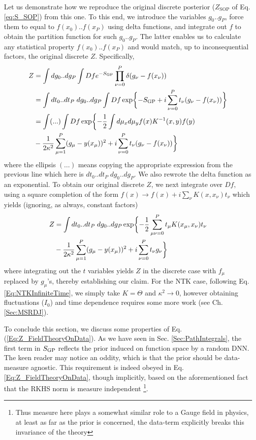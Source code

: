 Let us demonstrate how we reproduce the original discrete posterior  ($Z_{\textrm{SOP}}$ of Eq. \eqref{eq:S_SOP}) from this one. To this end, we introduce the variables $g_0..g_P$, force them to equal to $f(x_0)..f(x_P)$ using delta functions, and integrate out $f$ to obtain the partition function for such $g_0..g_P$. The latter enables us to calculate any statistical property $f(x_0)..f(x_P)$ and would match, up to inconsequential factors, the original discrete $Z$. Specifically, 
\begin{align}
Z &= \int dg_0..dg_P \int Df  e^{-S_{\text{GP}}} \prod_{\nu=0}^P \delta(g_{\nu}-f(x_{\nu})) \\ \nonumber 
&= \int dt_0..dt_P \; dg_0..dg_P \int Df \exp\biggl\{-S_{\text{GP}}+i\sum_{\nu=0}^P t_{\nu}(g_{\nu}-f(x_{\nu})) \biggl\} \\ \nonumber
&= \notag \int (...) \int Df \exp\biggl\{-\frac{1}{2} \int d\mu_x d\mu_y f(x) K^{-1}(x,y) f(y) \\&- \frac{1}{2\kappa^2}\sum_{\mu=1}^P (g_{\mu}-y(x_{\mu}))^2+i\sum_{\nu=0}^P t_{\nu}(g_{\nu}-f(x_{\nu})) \biggl\}
\end{align}
where the ellipsis $(...)$ means copying the appropriate expression from the previous line which here is $dt_0..dt_P \; dg_0..dg_P$. We also rewrote the delta function as an exponential. To obtain our original discrete $Z$, we next integrate over $Df$, using a square completion of the form $f(x) \rightarrow f(x)+i\sum_{\nu} K(x,x_{\nu})t_{\nu}$ which yields (ignoring, as always, constant factors)  
\begin{align}
\notag Z &= \int dt_0..dt_P \; dg_0..dg_P \exp\biggl\{-\frac{1}{2} \sum_{\mu \nu=0}^P t_{\mu} K(x_{\mu},x_{\nu})t_{\nu} \\&- \frac{1}{2\kappa^2}\sum_{\mu=1}^P (g_{\mu}-y(x_{\mu}))^2+i\sum_{\nu=0}^P t_{\nu}g_{\nu}\biggl\}\end{align}
where integrating out the $t$ variables yields $Z$ in the discrete case with $f_{\mu}$ replaced by $g_{\mu}$'s, thereby establishing our claim. For the NTK case, following Eq. \ref{Eq:NTKInfiniteTime}, we simply take $K=\Theta$ and $\kappa^2\to 0$, however obtaining fluctuations ($I_0$) and time dependence requires some more work (see Ch. \ref{Sec:MSRDJ}).

To conclude this section, we discuss some properties of Eq. (\ref{Eq:Z_FieldTheoryOnData}). As we have seen in Sec. \ref{Sec:PathIntegrals}, the first term in $S_{\text{GP}}$ reflects the prior induced on function space by a random DNN. The keen reader may notice an oddity, which is that the prior should be data-measure agnostic. This requirement is indeed obeyed in Eq. \ref{Eq:Z_FieldTheoryOnData}, though implicitly, based on the aforementioned fact that the RKHS norm is measure independent \footnote{Thus measure here plays a somewhat similar role to a Gauge field in physics, at least as far as the prior is concerned, the data-term explicitly breaks this invariance of the theory}. 

